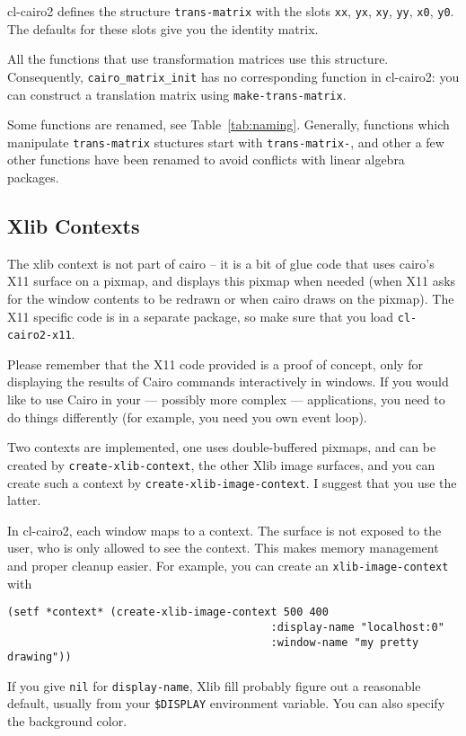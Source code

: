\documentclass[12pt,letterpaper,dvipdfm]{article}
\begin{document}
cl-cairo2 defines the structure \lstinline!trans-matrix! with the
slots \lstinline!xx!, \lstinline!yx!, \lstinline!xy!, \lstinline!yy!,
\lstinline!x0!, \lstinline!y0!.  The defaults for these slots give you
the identity matrix.

All the functions that use transformation matrices use this structure.
Consequently, \verb!cairo_matrix_init! has no corresponding function
in cl-cairo2: you can construct a translation matrix using
\lstinline!make-trans-matrix!.

Some functions are renamed, see Table~\ref{tab:naming}.  Generally,
functions which manipulate \lstinline!trans-matrix! stuctures start
with \lstinline!trans-matrix-!, and other a few other functions have
been renamed to avoid conflicts with linear algebra packages.

\subsection{Xlib Contexts}
\label{sec:xlib-context}

The xlib context is not part of cairo -- it is a bit of glue code that
uses cairo's X11 surface on a pixmap, and displays this pixmap when
needed (when X11 asks for the window contents to be redrawn or when
cairo draws on the pixmap).  The X11 specific code is in a separate
package, so make sure that you load \lstinline!cl-cairo2-x11!.

Please remember that the X11 code provided is a proof of concept, only
for displaying the results of Cairo commands interactively in windows.
If you would like to use Cairo in your --- possibly more complex ---
applications, you need to do things differently (for example, you need
you own event loop).

Two contexts are implemented, one uses double-buffered pixmaps, and
can be created by \lstinline!create-xlib-context!, the other Xlib
image surfaces, and you can create such a context by
\lstinline!create-xlib-image-context!.  I suggest that you use the
latter.

In cl-cairo2, each window maps to a context.  The surface is not
exposed to the user, who is only allowed to see the context.  This
makes memory management and proper cleanup easier.  For example, you
can create an \lstinline!xlib-image-context! with
\begin{lstlisting}
(setf *context* (create-xlib-image-context 500 400
                                         :display-name "localhost:0"
                                         :window-name "my pretty drawing"))
\end{lstlisting}
If you give \lstinline!nil! for \lstinline!display-name!, Xlib fill
probably figure out a reasonable default, usually from your
\verb!$DISPLAY! environment variable.  You can also specify the
background color.
\end{document}
